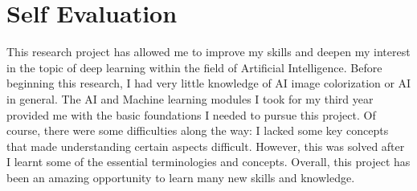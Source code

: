 \section{Self Evaluation}
This research project has allowed me to improve my skills and deepen my interest in the topic of deep learning within the field of Artificial Intelligence. Before beginning this research, I had very little knowledge of AI image colorization or AI in general. The AI and Machine learning modules I took for my third year provided me with the basic foundations I needed to pursue this project. Of course, there were some difficulties along the way: I lacked some key concepts that made understanding certain aspects difficult. However, this was solved after I learnt some of the essential terminologies and concepts. Overall, this project has been an amazing opportunity to learn many new skills and knowledge.

